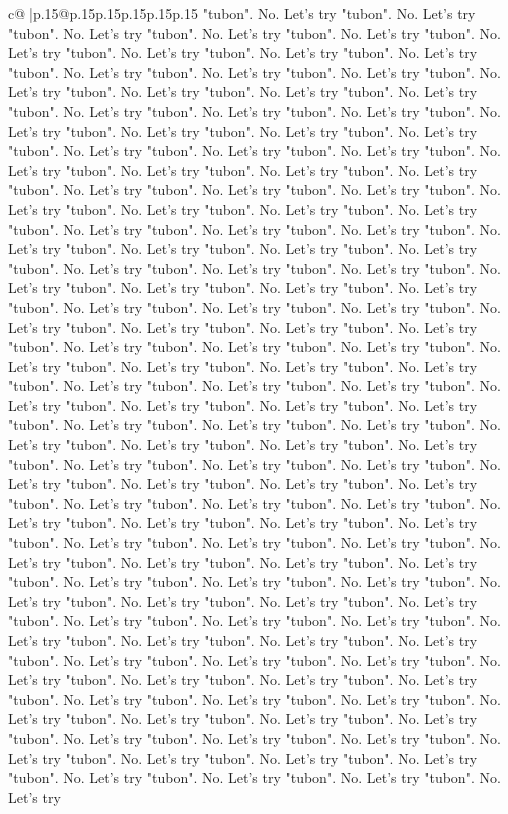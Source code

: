 \documentclass{article}
\begin{document}
{\begin{supertabular}{c@{$\;$}|p{.15\linewidth}@{}p{.15\linewidth}p{.15\linewidth}p{.15\linewidth}p{.15\linewidth}p{.15\linewidth}}
{{{"tubon". No. Let's try "tubon". No. Let's try "tubon". No. Let's try "tubon". No. Let's try "tubon". No. Let's try "tubon". No. Let's try "tubon". No. Let's try "tubon". No. Let's try "tubon". No. Let's try "tubon". No. Let's try "tubon". No. Let's try "tubon". No. Let's try "tubon". No. Let's try "tubon". No. Let's try "tubon". No. Let's try "tubon". No. Let's try "tubon". No. Let's try "tubon". No. Let's try "tubon". No. Let's try "tubon". No. Let's try "tubon". No. Let's try "tubon". No. Let's try "tubon". No. Let's try "tubon". No. Let's try "tubon". No. Let's try "tubon". No. Let's try "tubon". No. Let's try "tubon". No. Let's try "tubon". No. Let's try "tubon". No. Let's try "tubon". No. Let's try "tubon". No. Let's try "tubon". No. Let's try "tubon". No. Let's try "tubon". No. Let's try "tubon". No. Let's try "tubon". No. Let's try "tubon". No. Let's try "tubon". No. Let's try "tubon". No. Let's try "tubon". No. Let's try "tubon". No. Let's try "tubon". No. Let's try "tubon". No. Let's try "tubon". No. Let's try "tubon". No. Let's try "tubon". No. Let's try "tubon". No. Let's try "tubon". No. Let's try "tubon". No. Let's try "tubon". No. Let's try "tubon". No. Let's try "tubon". No. Let's try "tubon". No. Let's try "tubon". No. Let's try "tubon". No. Let's try "tubon". No. Let's try "tubon". No. Let's try "tubon". No. Let's try "tubon". No. Let's try "tubon". No. Let's try "tubon". No. Let's try "tubon". No. Let's try "tubon". No. Let's try "tubon". No. Let's try "tubon". No. Let's try "tubon". No. Let's try "tubon". No. Let's try "tubon". No. Let's try "tubon". No. Let's try "tubon". No. Let's try "tubon". No. Let's try "tubon". No. Let's try "tubon". No. Let's try "tubon". No. Let's try "tubon". No. Let's try "tubon". No. Let's try "tubon". No. Let's try "tubon". No. Let's try "tubon". No. Let's try "tubon". No. Let's try "tubon". No. Let's try "tubon". No. Let's try "tubon". No. Let's try "tubon". No. Let's try "tubon". No. Let's try "tubon". No. Let's try "tubon". No. Let's try "tubon". No. Let's try "tubon". No. Let's try "tubon". No. Let's try "tubon". No. Let's try "tubon". No. Let's try "tubon". No. Let's try "tubon". No. Let's try "tubon". No. Let's try "tubon". No. Let's try "tubon". No. Let's try "tubon". No. Let's try "tubon". No. Let's try "tubon". No. Let's try "tubon". No. Let's try "tubon". No. Let's try "tubon". No. Let's try "tubon". No. Let's try "tubon". No. Let's try "tubon". No. Let's try "tubon". No. Let's try "tubon". No. Let's try "tubon". No. Let's try "tubon". No. Let's try "tubon". No. Let's try "tubon". No. Let's try "tubon". No. Let's try "tubon". No. Let's try "tubon". No. Let's try "tubon". No. Let's try "tubon". No. Let's try "tubon". No. Let's try "tubon". No. Let's try "tubon". No. Let's try "tubon". No. Let's try "tubon". No. Let's try "tubon". No. Let's try "tubon". No. Let's try "tubon". No. Let's try "tubon". No. Let's try "tubon". No. Let's try "tubon". No. Let's try "tubon". No. Let's try "tubon". No. Let's try "tubon". No. Let's try "tubon". No. Let's try "tubon". No. Let's try "tubon". No. Let's try "tubon". No. Let's try "tubon". No. Let's try "tubon". No. Let's try "tubon". No. Let's try }}}
\end{supertabular}}
\end{document}
